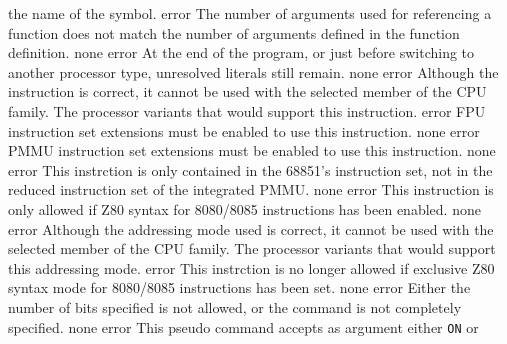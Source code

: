\documentclass[12pt,twoside]{report}
\newcommand{\tty}[1]{{\tt #1}}
\begin{document}
\begin{description}
               {the name of the symbol.}
               {error}
               {The number of arguments used for referencing a function
                does not match the number of arguments defined in the
                function definition.}
               {none}
               {error}
               {At the end of the program, or just before switching to
                another processor type, unresolved literals still remain.}
               {none}
               {error}
               {Although the instruction is correct, it cannot be used with
                the selected member of the CPU family.}
               {The processor variants that would support this
                instruction.}
               {error}
               {FPU instruction set extensions must be enabled to
                use this instruction.}
               {none}
               {error}
               {PMMU instruction set extensions must be enabled
                to use this instruction.}
               {none}
               {error}
               {This instrction is only contained in the 68851's
                instruction set, not in the reduced instruction
                set of the integrated PMMU.}
               {none}
               {error}
               {This instruction is only allowed if Z80 syntax
                for 8080/8085 instructions has been enabled.}
               {none}
               {error}
               {Although the addressing mode used is correct, it cannot be
                used with the selected member of the CPU family.}
               {The processor variants that would support this
                addressing mode.}
               {error}
               {This instrction is no longer allowed if exclusive
                Z80 syntax mode for 8080/8085 instructions has been set.}
               {none}
               {error}
               {Either the number of bits specified is not allowed, or
                the command is not completely specified.}
               {none}
               {error}
               {This pseudo command accepts as argument either \tty{ON} or
}
\end{description}
\end{document}
